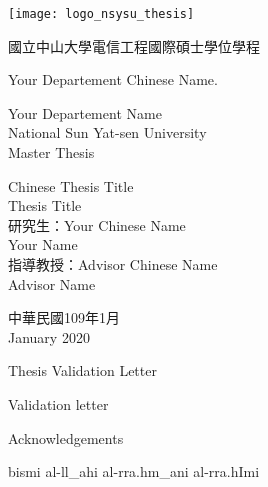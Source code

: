 \documentclass[12pt, twoside , openright]{book}
\begin{document}
\thispagestyle{empty}
\begin{center}
	\onehalfspacing
	\texttt{[image: logo\_nsysu\_thesis]}
	
	{\chinnesesize 國立中山大學電信工程國際碩士學位學程
		
		Your Departement Chinese Name.}
	
	{\bigsize Your Departement Name\\National Sun Yat-sen University\\}
	{\bigsize Master Thesis\\}
	
	\vspace{2cm}
	{\chinnesesize Chinese Thesis Title\\}
	{\bigsize Thesis Title\\}
	\vspace{2cm}
	{\bigsize 研究生：Your Chinese Name\\
		\hspace{70pt} Your Name\\
		指導教授：Advisor Chinese Name\\
		\hspace{130pt}Advisor Name \\
	}
	
	\vspace{1.5cm}
	
	{\bigsize 中華民國109年1月\\
		January 2020\\
		
	}
\end{center}
\frontmatter
\newpage



\begin{center}
	{\chinnesesize Thesis Validation Letter }
\end{center}
Validation letter
\newpage
\mbox{}
\newpage



\begin{center}
	{\chinnesesize Acknowledgements}
\end{center}
\setarab
\fullvocalize
\arabtrue
\begin{center}
	\begin{RLtext}
		bismi al-ll_ahi al-rra.hm_ani al-rra.hImi
	\end{RLtext}
\end{center}
\end{document}
